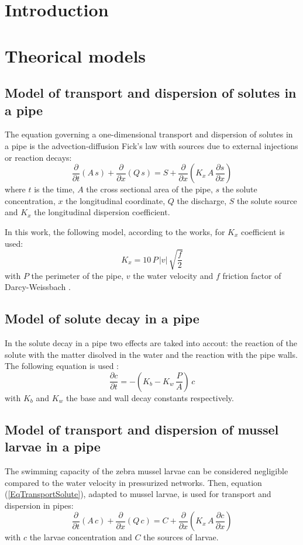 \documentclass[review,authoryear]{elsarticle}
\newcommand{\EQ}[2]{\begin{equation}#1\label{#2}\end{equation}}
\newcommand{\PA}[1]{\left(#1\right)}
\newcommand{\PARTIAL}[2]{\frac{\partial#1}{\partial#2}}
\begin{document}
\section{Introduction}

\section{Theorical models}

\subsection{Model of transport and dispersion of solutes in a pipe}

The equation governing a one-dimensional transport and dispersion of solutes in
a pipe is the advection-diffusion Fick's law with sources due to external
injections or reaction decays:
\EQ{\PARTIAL{}{t}(A\,s)+\PARTIAL{}{x}(Q\,s)
	=S+\PARTIAL{}{x}\PA{K_x\,A\,\PARTIAL{s}{x}}}{EqTransportSolute}
where $t$ is the time, $A$ the cross sectional area of the pipe, $s$ the solute
concentration, $x$ the longitudinal coordinate, $Q$ the discharge, $S$ the
solute source and $K_x$ the longitudinal dispersion coefficient.

In this work, the following model, according to the \citet{Rutherford94} works,
for $K_x$ coefficient is used:
\EQ{K_x=10\,P\,|v|\,\sqrt{\frac{f}{2}}}{EqKx}  
with $P$ the perimeter of the pipe, $v$ the water velocity and $f$ friction
factor of Darcy-Weissbach \citep{Darcy58}.

\subsection{Model of solute decay in a pipe}

In the solute decay in a pipe two effects are taked into accout: the reaction of
the solute with the matter disolved in the water and the reaction with the pipe
walls. The following equation is used \citep{DiGianoZhang05}:
\EQ{\PARTIAL{c}{t}=-\PA{K_b-K_w\,\frac{P}{A}}\,c}{EqSoluteDecay}
with $K_b$ and $K_w$ the base and wall decay constants respectively. 

\subsection{Model of transport and dispersion of mussel larvae in a pipe}

The swimming capacity of the zebra mussel larvae can be considered negligible
compared to the water velocity in pressurized networks. Then, equation
(\ref{EqTransportSolute}), adapted to mussel larvae, is used for transport and
dispersion in pipes:
\EQ{\PARTIAL{}{t}(A\,c)+\PARTIAL{}{x}(Q\,c)
	=C+\PARTIAL{}{x}\PA{K_x\,A\,\PARTIAL{c}{x}}}{EqTransportLarvae}
with $c$ the larvae concentration and $C$ the sources of larvae.
\end{document}
